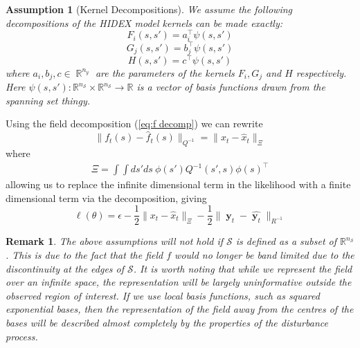 \documentclass{IEEEtran}
\newcommand{\dist}[2]{\|#1\|_{#2}}
\DeclareMathOperator{\R}{\mathbb{R}}
\DeclareMathOperator{\yvec}{\mathbf{y}}
\DeclareMathOperator{\onto}{\rightarrow}
\newtheorem{remark}{Remark}
\newtheorem{assumption}{Assumption}
\begin{document}
\begin{assumption}[Kernel Decompositions]
	\label{ass:kerndecomp}
	We assume the following decompositions of the HIDEX model kernels can be made exactly:
	\begin{equation}
	F_i(s,s') = a_i^\top\psi(s,s')
\end{equation}
\begin{equation}
	G_j(s,s') = b_j^\top\psi(s,s')
\end{equation}
\begin{equation}
	H(s,s') = c^\top\psi(s,s')
\end{equation}
where $a_i, b_j, c \in \R^{n_y}$ are the parameters of the kernels $F_i, G_j$ and $H$ respectively. Here $\psi(s,s') : \mathbb{R}^{n_\mathcal{S}} \times \mathbb{R}^{n_\mathcal{S}} \onto \mathbb{R}$ is a vector of basis functions drawn from the spanning set thingy.
\end{assumption}

Using the field decomposition (\ref{eq:f decomp}) we can rewrite 
\begin{equation}
	\dist{f_t(s) - \hat{f}_t(s)}{Q^{-1}} = \dist{x_t - \hat{x}_t}{\Xi}
\end{equation}
where
\begin{equation}
	\begin{split}
	\Xi = \int\int ds' ds ~ \phi(s')Q^{-1}(s',s)\phi(s)^\top
	\end{split}
\end{equation}
allowing us to replace the infinite dimensional term in the likelihood with a finite dimensional term via the decomposition, giving
\begin{equation}
	\ell(\theta) =  \epsilon  - \frac{1}{2}\dist{x_t - \hat{x}_t}{\Xi} - \frac{1}{2}\dist{\yvec_t-\hat{\yvec_t}}{R^{-1}}
\end{equation}

\begin{remark}
	The above assumptions will not hold if $\mathcal{S}$ is defined as a subset of $\mathbb{R}^{n_\mathcal{S}}$. This is due to the fact that the field $f$ would no longer be band limited due to the discontinuity at the edges of $\mathcal{S}$. It is worth noting that while we represent the field over an infinite space, the representation will be largely uninformative outside the observed region of interest. If we use local basis functions, such as squared exponential bases, then the representation of the field away from the centres of the bases will be described almost completely by the properties of the disturbance process.
\end{remark}
\end{document}
